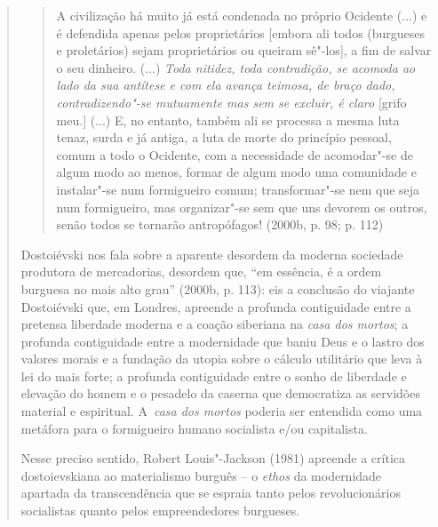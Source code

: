 {\begin{quote}
\begin{quote}
A civilização há muito já está condenada no próprio Ocidente (...) e é
defendida apenas pelos proprietários {[}embora ali todos (burgueses e
proletários) sejam proprietários ou queiram sê"-los{]}, a fim de salvar o
seu dinheiro. (...) \emph{Toda nitidez, toda contradição, se acomoda ao
lado da sua antítese e com ela avança teimosa, de braço dado,
contradizendo"-se mutuamente mas sem se excluir, é claro} {[}grifo
meu.{]} (...) E, no entanto, também ali se processa a mesma luta tenaz,
surda e já antiga, a luta de morte do princípio pessoal, comum a todo o
Ocidente, com a necessidade de acomodar"-se de algum modo ao menos,
formar de algum modo uma comunidade e instalar"-se num formigueiro comum;
transformar"-se nem que seja num formigueiro, mas organizar"-se sem que
uns devorem os outros, senão todos se tornarão antropófagos! (2000b, p.
98; p. 112)
\end{quote}

Dostoiévski nos fala sobre a aparente desordem da moderna sociedade
produtora de mercadorias, desordem que, ``em essência, é a ordem
burguesa no mais alto grau'' (2000b, p. 113): eis a conclusão do
viajante Dostoiévski que, em Londres, apreende a profunda contiguidade
entre a pretensa liberdade moderna e a coação siberiana na \emph{casa
dos mortos}; a profunda contiguidade entre a modernidade que baniu Deus
e o lastro dos valores morais e a fundação da utopia sobre o cálculo
utilitário que leva à lei do mais forte; a profunda contiguidade entre o
sonho de liberdade e elevação do homem e o pesadelo da caserna que
democratiza as servidões material e espiritual. A~\emph{casa dos mortos}
poderia ser entendida como uma metáfora para o formigueiro humano
socialista e/ou capitalista.

Nesse preciso sentido, Robert Louis"-Jackson (1981) apreende a crítica
dostoievskiana ao materialismo burguês -- o \emph{ethos} da modernidade
apartada da transcendência que se espraia tanto pelos revolucionários
socialistas quanto pelos empreendedores burgueses.


\end{quote}}
